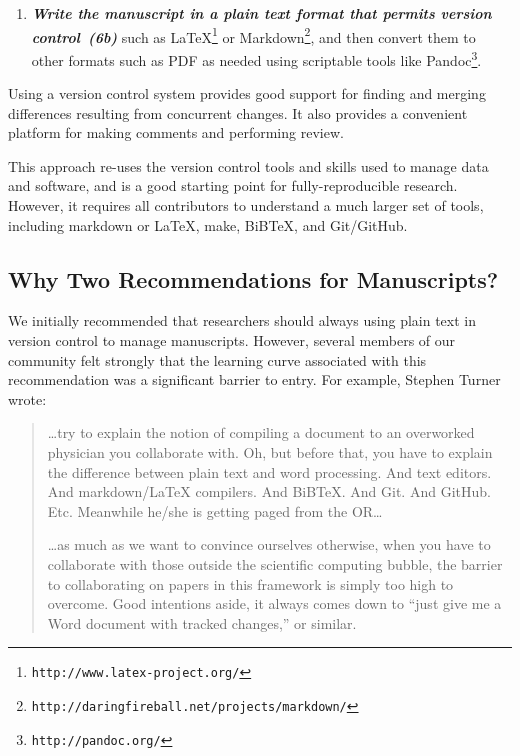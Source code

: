 \documentclass[10pt,letterpaper]{article}
\newcommand{\withurl}[2]{{#1}\footnote{{\texttt{#2}}}}
\newcommand{\practice}[2]{\textbf{\emph{{#2}~({#1})}}}
\begin{document}
\begin{enumerate}

\item

  \practice{6b}{Write the manuscript in a plain text format that
  permits version control} such as
  \withurl{LaTeX}{http://www.latex-project.org/} or
  \withurl{Markdown}{http://daringfireball.net/projects/markdown/},
  and then convert them to other formats such as PDF as needed using
  scriptable tools like \withurl{Pandoc}{http://pandoc.org/}.

\end{enumerate}

Using a version control system provides good support for finding and
merging differences resulting from concurrent changes. It also
provides a convenient platform for making comments and performing
review.

This approach re-uses the version control tools and skills used to
manage data and software, and is a good starting point for
fully-reproducible research. However, it requires all contributors to
understand a much larger set of tools, including markdown or LaTeX,
make, BiBTeX, and Git/GitHub.

\subsection*{Why Two Recommendations for Manuscripts?}

We initially recommended that researchers should always using plain
text in version control to manage manuscripts.  However, several
members of our community felt strongly that the learning curve
associated with this recommendation was a significant barrier to
entry.  For example, Stephen Turner wrote:

\begin{quote}

  {\ldots}try to explain the notion of compiling a document to an
  overworked physician you collaborate with. Oh, but before that, you
  have to explain the difference between plain text and word
  processing. And text editors. And markdown/LaTeX compilers. And
  BiBTeX. And Git. And GitHub. Etc. Meanwhile he/she is getting paged
  from the OR{\ldots}

  {\ldots}as much as we want to convince ourselves otherwise, when you
  have to collaborate with those outside the scientific computing
  bubble, the barrier to collaborating on papers in this framework is
  simply too high to overcome. Good intentions aside, it always comes
  down to ``just give me a Word document with tracked changes,'' or
  similar.

\end{quote}
\end{document}
